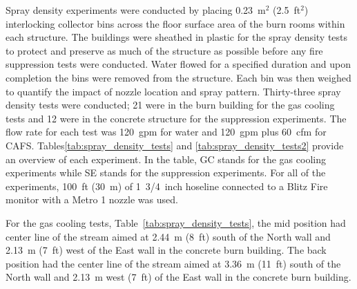 \documentclass[12pt,oneside]{book}
\begin{document}
Spray density experiments were conducted by placing 0.23~m$^2$ (2.5~ft$^2$) interlocking collector bins across the floor surface area of the burn rooms within each structure. The buildings were sheathed in plastic for the spray density tests to protect and preserve as much of the structure as possible before any fire suppression tests were conducted. Water flowed for a specified duration and upon completion the bins were removed from the structure. Each bin was then weighed to quantify the impact of nozzle location and spray pattern. Thirty-three spray density tests were conducted; 21 were in the burn building for the gas cooling tests and 12 were in the concrete structure for the suppression experiments. The flow rate for each test was 120~gpm for water and 120~gpm plus 60~cfm for CAFS. Tables\ref{tab:spray_density_tests} and \ref{tab:spray_density_tests2} provide an overview of each experiment. In the table, GC stands for the gas cooling experiments while SE stands for the suppression experiments. For all of the experiments, 100~ft (30~m) of 1~3/4~inch hoseline connected to a Blitz Fire monitor with a Metro 1 nozzle was used.

For the gas cooling tests, Table~\ref{tab:spray_density_tests}, the mid position had center line of the stream aimed at 2.44~m (8~ft) south of the North wall and 2.13~m (7~ft) west of the East wall in the concrete burn building. The back position had the center line of the stream aimed at 3.36~m (11~ft) south of the North wall and 2.13~m west (7~ft) of the East wall in the concrete burn building.
\end{document}
